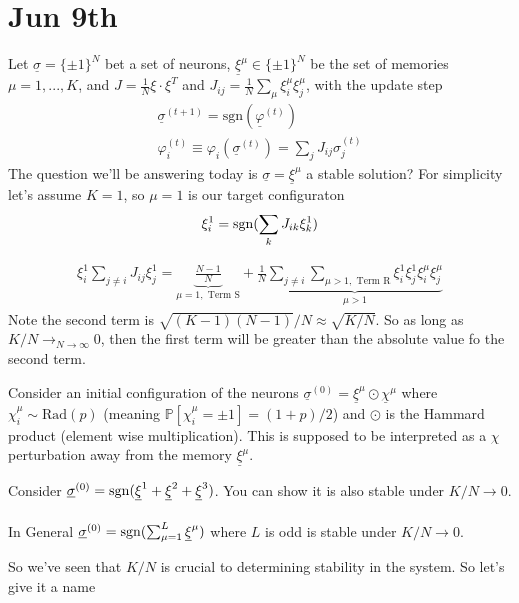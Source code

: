 \section{Jun 9th}
Let $\underline \sigma = \{\pm 1\}^{N}$ bet a set of neurons, $\underline \xi^\mu \in \{\pm 1\}^N$ be the set of memories $\mu = 1,... , K$, and $J = \frac{1}{N} \xi \cdot \xi^T$ and $J_{ij} = \frac{1}{N} \sum_\mu \xi_i^\mu \xi_j^\mu$, with the update step
\begin{align}
	\underline\sigma^{(t+1)} = \text{sgn}(\underline \varphi^{(t)})\\
	\varphi_i^{(t)} \equiv \varphi_i(\underline \sigma^{(t)}) = \sum_j J_{ij} \sigma_j^{(t)}
\end{align}
The question we'll be answering today is $\underline \sigma = \underline \xi^\mu$ a stable solution? For simplicity let's assume $K=1$, so $\mu=1$ is our target configuraton
\begin{align}
	\xi_i^1 = \operatorname{sgn}(\sum_k J_{ik} \xi_k^1)
\end{align}

\begin{align}
	\xi_i^1 \sum_{j \neq i} J_{ij} \xi_{j}^1 = \underbrace{\frac{N-1}{N}}_{\mu=1, \text{ Term S}} + \frac{1}{N}\underbrace{\sum_{j \neq i} \sum_{\mu > 1, \text{ Term R}} \xi_i^1 \xi_j^1 \xi_i^\mu \xi_j^\mu}_{\mu > 1} \label{eqn:Jun9th_ExpandedTerm}
\end{align}
Note the second term is $\sqrt{(K-1)(N-1)}/N \approx \sqrt{K/N}$. So as long as $K/N \to_{N \to \infty} 0$, then the first term will be greater than the absolute value fo the second term.
\begin{sidework}
	Consider an initial configuration of the neurons $\underline \sigma^{(0)} = \underline \xi^\mu \odot \underline \chi^\mu$ where $\chi_i^\mu \sim \text{Rad}(p)$ (meaning $\mathbb P[\chi_i^\mu = \pm 1] = (1 + p)/2$) and $\odot$ is the Hammard product (element wise multiplication). This is supposed to be interpreted as a $\chi$ perturbation away from the memory $\underline \xi^\mu$.
\end{sidework}
\begin{sidework}
Consider $\underline \sigma^{(0)} = \operatorname{sgn}(\underline \xi^1 + \underline \xi^2 + \underline \xi^3)$. You can show it is also stable under $K/N \to 0$.\\
\\
In General $\underline \sigma^{(0)} = \operatorname{sgn}(\sum_{\mu=1}^L\underline\xi^\mu )$ where $L$ is odd is stable under $K/N \to 0$.
\end{sidework}
So we've seen that $K/N$ is crucial to determining stability in the system. So let's give it a name

